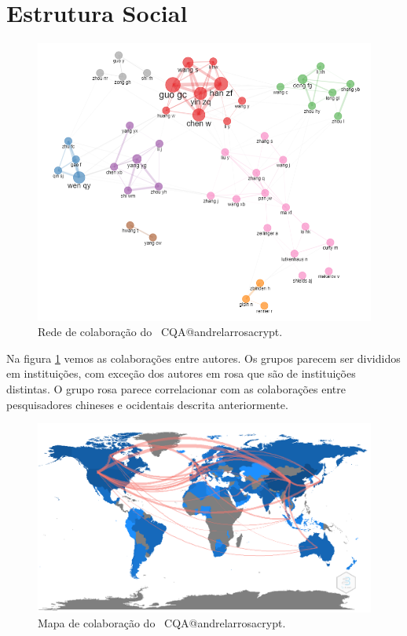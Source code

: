 \section{Estrutura Social}

\begin{figure}
    \centering
    \includegraphics[angle=0,width=1\textwidth]{experiments/andrelarrosacrypt/AnaliseBibliometrica/CriptografiaQuantica/imagens/CQA@andrelarrosacrypt_Colab.png}
    \caption{Rede de colaboração do \dataset\ CQA@andrelarrosacrypt.}
    \label{CQA@andrelarrosacrypt_Colab}
\end{figure}

Na figura \ref{CQA@andrelarrosacrypt_Colab} vemos as colaborações entre autores. Os grupos parecem ser divididos em instituições, com exceção dos autores em rosa que são de instituições distintas. O grupo rosa parece correlacionar com as colaborações entre pesquisadores chineses e ocidentais descrita anteriormente.

\begin{figure}
    \centering
    \includegraphics[angle=0,width=1\textwidth]{experiments/andrelarrosacrypt/AnaliseBibliometrica/CriptografiaQuantica/imagens/CQA@andrelarrosacrypt_ColabMap.png}
    \caption{Mapa de colaboração do \dataset\ CQA@andrelarrosacrypt.}
    \label{CQA@andrelarrosacrypt_ColabMap}
\end{figure}

